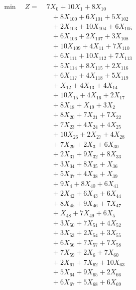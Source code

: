 \documentclass[a4paper,10pt]{article}
\begin{document}
\allowdisplaybreaks
{\small
\begin{align}
\min \quad Z = &\; 7X_{0} + 10X_{1} + 8X_{10} \\[0.5ex]
&\quad  + 8X_{100} + 6X_{101} + 5X_{102} \\[0.5ex]
&\quad  + 2X_{103} + 10X_{104} + 6X_{105} \\[0.5ex]
&\quad  + 6X_{106} + 2X_{107} + 3X_{108} \\[0.5ex]
&\quad  + 10X_{109} + 4X_{11} + 7X_{110} \\[0.5ex]
&\quad  + 6X_{111} + 10X_{112} + 7X_{113} \\[0.5ex]
&\quad  + 5X_{114} + 8X_{115} + 2X_{116} \\[0.5ex]
&\quad  + 6X_{117} + 4X_{118} + 5X_{119} \\[0.5ex]
&\quad  + X_{12} + 4X_{13} + 4X_{14} \\[0.5ex]
&\quad  + 10X_{15} + 4X_{16} + 2X_{17} \\[0.5ex]
&\quad  + 8X_{18} + X_{19} + 3X_{2} \\[0.5ex]
&\quad  + 8X_{20} + 7X_{21} + 7X_{22} \\[0.5ex]
&\quad  + 7X_{23} + 4X_{24} + 4X_{25} \\[0.5ex]
&\quad  + 10X_{26} + 2X_{27} + 4X_{28} \\[0.5ex]
&\quad  + 7X_{29} + 2X_{3} + 6X_{30} \\[0.5ex]
&\quad  + 2X_{31} + 9X_{32} + 8X_{33} \\[0.5ex]
&\quad  + 3X_{34} + 8X_{35} + X_{36} \\[0.5ex]
&\quad  + 5X_{37} + 4X_{38} + X_{39} \\[0.5ex]
&\quad  + 9X_{4} + 8X_{40} + 6X_{41} \\[0.5ex]
&\quad  + 2X_{42} + 6X_{43} + 6X_{44} \\[0.5ex]
&\quad  + 8X_{45} + 9X_{46} + 7X_{47} \\[0.5ex]
&\quad  + X_{48} + 7X_{49} + 6X_{5} \\[0.5ex]
&\quad  + 3X_{50} + 7X_{51} + 4X_{52} \\[0.5ex]
&\quad  + 3X_{53} + 2X_{54} + 3X_{55} \\[0.5ex]
&\quad  + 6X_{56} + 7X_{57} + 7X_{58} \\[0.5ex]
&\quad  + 7X_{59} + 2X_{6} + 7X_{60} \\[0.5ex]
&\quad  + 2X_{61} + 7X_{62} + 10X_{63} \\[0.5ex]
&\quad  + 5X_{64} + 9X_{65} + 2X_{66} \\[0.5ex]
&\quad  + 6X_{67} + 5X_{68} + 6X_{69} \\[0.5ex]

\end{align}}
\end{document}
